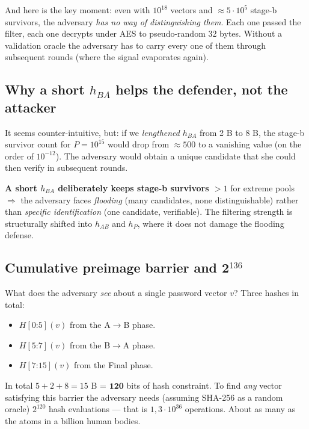 \documentclass[11pt,a4paper]{article}
\begin{document}
And here is the key moment: even with $10^{18}$ vectors and $\approx 5 \cdot 10^5$ stage-b survivors, the adversary \emph{has no way of distinguishing them}. Each one passed the filter, each one decrypts under AES to pseudo-random 32 bytes. Without a validation oracle the adversary has to carry every one of them through subsequent rounds (where the signal evaporates again).

\subsection{Why a short \texorpdfstring{$h_{BA}$}{h\_BA} helps the defender, not the attacker}

It seems counter-intuitive, but: if we \emph{lengthened} $h_{BA}$ from 2 B to 8 B, the stage-b survivor count for $P = 10^{15}$ would drop from $\approx 500$ to a vanishing value (on the order of $10^{-12}$). The adversary would obtain a unique candidate that she could then verify in subsequent rounds.

\textbf{A short $h_{BA}$ deliberately keeps stage-b survivors $> 1$} for extreme pools $\Rightarrow$ the adversary faces \emph{flooding} (many candidates, none distinguishable) rather than \emph{specific identification} (one candidate, verifiable). The filtering strength is structurally shifted into $h_{AB}$ and $h_P$, where it does not damage the flooding defense.

\subsection{Cumulative preimage barrier and 2\texorpdfstring{$^{136}$}{\^136}}

What does the adversary \emph{see} about a single password vector $v$? Three hashes in total:
\begin{itemize}[leftmargin=*]
\item $H[0\mathord{:}5](v)$ from the A$\to$B phase.
\item $H[5\mathord{:}7](v)$ from the B$\to$A phase.
\item $H[7\mathord{:}15](v)$ from the Final phase.
\end{itemize}

In total $5 + 2 + 8 = 15$ B = $\boldsymbol{120}$ bits of hash constraint. To find \emph{any} vector satisfying this barrier the adversary needs (assuming SHA-256 as a random oracle) $2^{120}$ hash evaluations --- that is $1{,}3 \cdot 10^{36}$ operations. About as many as the atoms in a billion human bodies.
\end{document}
